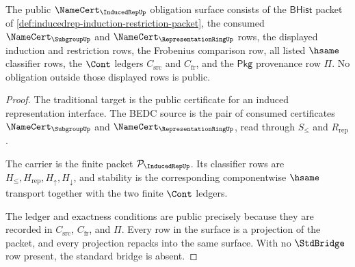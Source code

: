 \begin{theorem}
\label{thm:inducedrep-public-obligation-surface}
The public $\NameCert_{\InducedRepUp}$ obligation surface consists of the
$\mathsf{BHist}$ packet of
\autoref{def:inducedrep-induction-restriction-packet}, the consumed
$\NameCert_{\SubgroupUp}$ and $\NameCert_{\RepresentationRingUp}$ rows, the
displayed induction and restriction rows, the Frobenius comparison row, all
listed $\hsame$ classifier rows, the $\Cont$ ledgers
$C_{\mathrm{src}}$ and $C_{\mathrm{fr}}$, and the $\mathsf{Pkg}$ provenance
row $\Pi$. No obligation outside those displayed rows is public.
\end{theorem}
\begin{proof}
The traditional target is the public certificate for an induced
representation interface. The BEDC source is the pair of consumed
certificates $\NameCert_{\SubgroupUp}$ and
$\NameCert_{\RepresentationRingUp}$, read through $S_{\leq}$ and
$R_{\mathrm{rep}}$.

The carrier is the finite packet
$\mathcal{P}_{\InducedRepUp}$. Its classifier rows are
$H_{\leq},H_{\mathrm{rep}},H_{\uparrow},H_{\downarrow}$, and stability is the
corresponding componentwise $\hsame$ transport together with the two finite
$\Cont$ ledgers.

The ledger and exactness conditions are public precisely because they are
recorded in $C_{\mathrm{src}}$, $C_{\mathrm{fr}}$, and $\Pi$. Every row in the
surface is a projection of the packet, and every projection repacks into the
same surface. With no $\StdBridge$ row present, the standard bridge is absent.
\end{proof}

